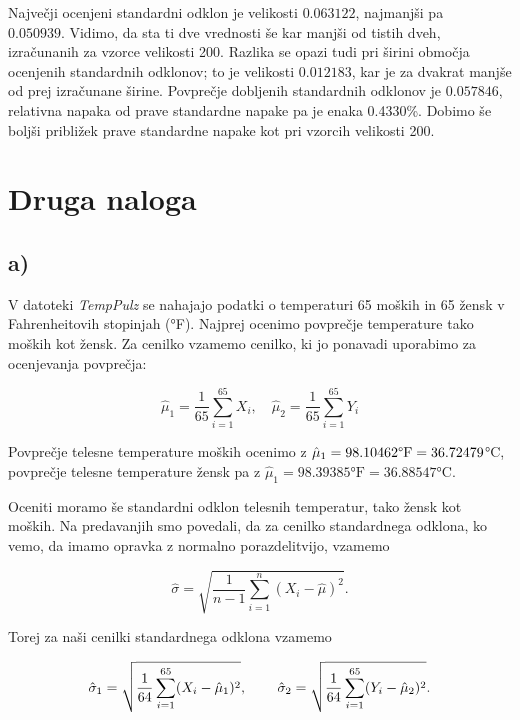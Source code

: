 \documentclass[12pt, a4paper]{article}
\begin{document}
Največji ocenjeni standardni odklon je velikosti  $0.063122$, najmanjši pa
\\$0.050939$. Vidimo, da sta ti dve vrednosti še kar manjši od tistih dveh, izračunanih
za vzorce velikosti 200. Razlika se opazi tudi pri širini območja ocenjenih 
standardnih odklonov; to je velikosti $0.012183$, kar je za dvakrat manjše od
prej izračunane širine. Povprečje dobljenih standardnih odklonov je $0.057846$, relativna 
napaka od prave standardne napake pa je enaka 0.4330\%. Dobimo še boljši približek 
prave standardne napake kot pri vzorcih velikosti 200.



\section*{Druga naloga}

\subsection*{a)}

V datoteki \emph{TempPulz} se nahajajo podatki o temperaturi  65
moških in 65 žensk v Fahrenheitovih stopinjah (°F). Najprej ocenimo povprečje
temperature tako moških kot žensk. Za cenilko vzamemo cenilko, ki jo ponavadi
uporabimo za ocenjevanja povprečja:

$$ \hat{\mu}_1 = \frac{1}{65}\sum^{65}_{i=1} X_i, \quad 
\hat{\mu}_2 = \frac{1}{65}\sum^{65}_{i=1} Y_i  
$$

Povprečje telesne temperature moških ocenimo z $\hat{\mu}_1 = 98.10462 \text{°F} = \\
36.72479$°C, povprečje telesne temperature žensk pa z $\hat{\mu}_1 = 
98.39385 \text{°F} = 36.88547$°C.

Oceniti moramo še standardni odklon telesnih temperatur, tako žensk kot moških.
Na predavanjih smo povedali, da za cenilko standardnega odklona, ko vemo, da
imamo opravka z normalno porazdelitvijo, vzamemo

$$ \hat{\sigma} = \sqrt{\frac{1}{n-1} \sum_{i=1}^{n} (X_i - \hat{\mu})^2}\text{.}
$$

Torej za naši cenilki standardnega odklona vzamemo

$$
\hat{\sigma}_1 = \sqrt{\frac{1}{64} \sum_{i=1}^{65} (X_i - \hat{\mu}_1)^2} \text{, \qquad}
\hat{\sigma}_2 = \sqrt{\frac{1}{64} \sum_{i=1}^{65} (Y_i - \hat{\mu}_2)^2} \text{.}
$$
\end{document}
